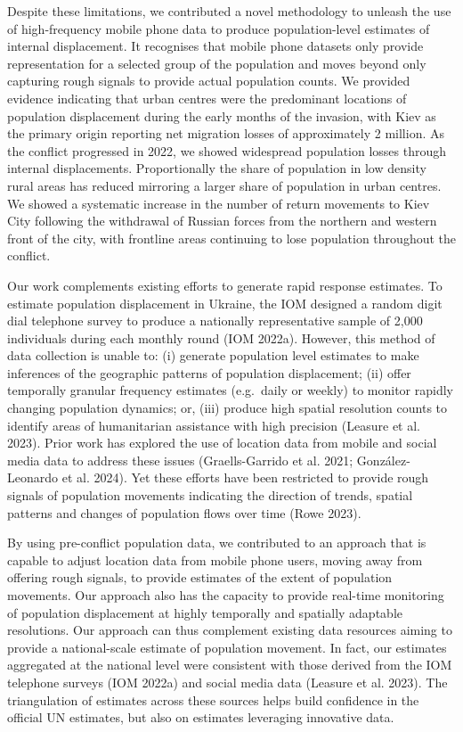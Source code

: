 \documentclass[
  sn-nature,
  11pt,
]{sn-jnl}
\begin{document}
Despite these limitations, we contributed a novel methodology to unleash
the use of high-frequency mobile phone data to produce population-level
estimates of internal displacement. It recognises that mobile phone
datasets only provide representation for a selected group of the
population and moves beyond only capturing rough signals to provide
actual population counts. We provided evidence indicating that urban
centres were the predominant locations of population displacement during
the early months of the invasion, with Kiev as the primary origin
reporting net migration losses of approximately 2 million. As the
conflict progressed in 2022, we showed widespread population losses
through internal displacements. Proportionally the share of population
in low density rural areas has reduced mirroring a larger share of
population in urban centres. We showed a systematic increase in the
number of return movements to Kiev City following the withdrawal of
Russian forces from the northern and western front of the city, with
frontline areas continuing to lose population throughout the conflict.

Our work complements existing efforts to generate rapid response
estimates. To estimate population displacement in Ukraine, the IOM
designed a random digit dial telephone survey to produce a nationally
representative sample of 2,000 individuals during each monthly round
(IOM 2022a). However, this method of data collection is unable to: (i)
generate population level estimates to make inferences of the geographic
patterns of population displacement; (ii) offer temporally granular
frequency estimates (e.g.~daily or weekly) to monitor rapidly changing
population dynamics; or, (iii) produce high spatial resolution counts to
identify areas of humanitarian assistance with high precision (Leasure
et al. 2023). Prior work has explored the use of location data from
mobile and social media data to address these issues (Graells-Garrido et
al. 2021; González-Leonardo et al. 2024). Yet these efforts have been
restricted to provide rough signals of population movements indicating
the direction of trends, spatial patterns and changes of population
flows over time (Rowe 2023).

By using pre-conflict population data, we contributed to an approach
that is capable to adjust location data from mobile phone users, moving
away from offering rough signals, to provide estimates of the extent of
population movements. Our approach also has the capacity to provide
real-time monitoring of population displacement at highly temporally and
spatially adaptable resolutions. Our approach can thus complement
existing data resources aiming to provide a national-scale estimate of
population movement. In fact, our estimates aggregated at the national
level were consistent with those derived from the IOM telephone surveys
(IOM 2022a) and social media data (Leasure et al. 2023). The
triangulation of estimates across these sources helps build confidence
in the official UN estimates, but also on estimates leveraging
innovative data.
\end{document}
